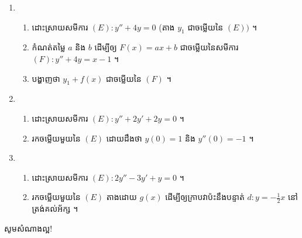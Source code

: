 \documentclass[12pt, a4paper]{article}
\begin{document}
\begin{enumerate}[m]
\begin{enumerate}[k]
	\end{enumerate}
	\item \begin{enumerate}[k]
		\item ដោះស្រាយសមីការ $(E): y''+4y=0$ (តាង $y_1$ ជាចម្លើយនៃ $(E))$ ។ 
		\item កំណត់តម្លៃ $a$ និង $b$ ដើម្បីឲ្យ $F(x)=ax+b$ ជាចម្លើយនៃសមីការ $(F):y''+4y=x-1$ ។
		\item បង្ហាញថា $y_1+f(x)$ ជាចម្លើយនៃ $(F)$ ។
	\end{enumerate}
	\item \begin{enumerate}[k]
		\item ដោះស្រាយសមីការ $(E):y''+2y'+2y=0$ ។
		\item រកចម្លើយមួយនៃ $(E)$ ដោយដឹងថា $y(0)=1$ និង $y''(0)=-1$ ។
	\end{enumerate}
	\item \begin{enumerate}[k]
		\item ដោះស្រាយសមីការ $(E):2y''-3y'+y=0$ ។
		\item រកចម្លើយមួយនៃ $(E)$ តាងដោយ $g(x)$ ដើម្បីឲ្យក្រាបវាប៉ះនឹងបន្ទាត់ $d:y=-\frac{1}{2}x$ នៅត្រង់គល់អ័ក្ស ។
	\end{enumerate}
\end{enumerate}
	\begin{center}
		\sffamily\color{black}
		សូមសំណាងល្អ!
	\end{center}\newpage
\end{document}
